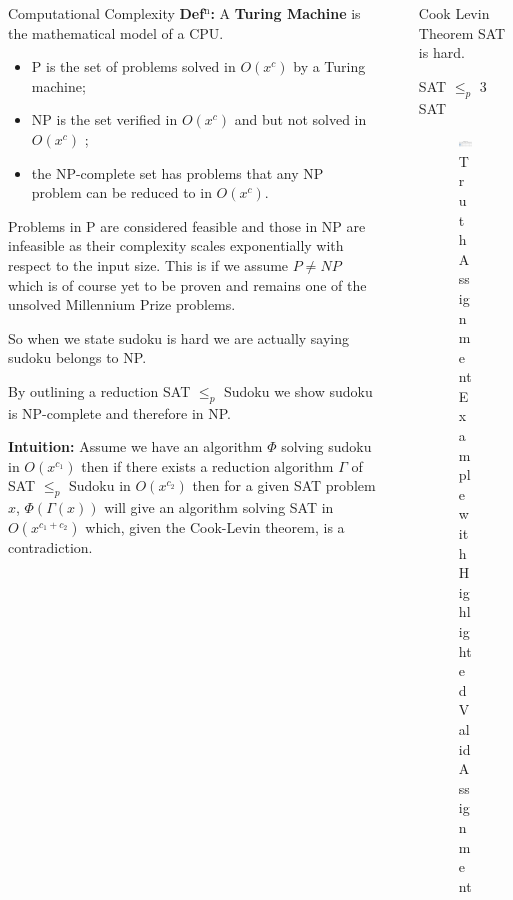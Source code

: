 \documentclass[final]{beamer}
\newlength{\sepwidth}
\newlength{\colwidth}
\newcounter{col}
\newcommand{\separatorcolumn}{\begin{column}{\sepwidth}\end{column}}
\begin{document}
\begin{frame}[t]
\begin{columns}[t]
\begin{column}{\colwidth}
\begin{block}{Computational Complexity \cite{arora2006computational}}
\textbf{Def$^\text{n}$:} A \textbf{Turing Machine} is the mathematical model of a CPU.



 \begin{itemize}
	\item{P is the set of problems solved in $O(x^c)$ by a Turing machine;} 
	\item{NP is the set verified in $O(x^c)$ and but not solved in $O(x^c)$ ;} 
	\item{the NP-complete set has problems that any NP problem can be reduced to in $O(x^c)$.} 
\end{itemize}
Problems in P are considered feasible and those in NP are infeasible as their complexity scales exponentially with respect to the input size. This is if we assume $P\neq NP$ which is of course yet to be proven and remains one of the unsolved Millennium Prize problems. 

So when we state sudoku is hard we are actually saying sudoku belongs to NP.

By outlining a reduction SAT $ \leq_p $ Sudoku we show sudoku is NP-complete and therefore in NP. 

\textbf{Intuition:} Assume we have an algorithm $\Phi$ solving sudoku in $O(x^{c_1})$ then if there exists a reduction algorithm $\Gamma$ of SAT $ \leq_p $ Sudoku in $O(x^{c_2})$  then for a given SAT problem $x$, $\Phi(\Gamma(x))$ will give an algorithm solving SAT in $O(x^{c_1+c_2})$ which, given the Cook-Levin theorem, is a contradiction. 

  \end{block}

\end{column}

\separatorcolumn

\begin{column}{\colwidth}  
\begin{alertblock}{Cook Levin Theorem}
SAT is hard.
  \end{alertblock}
  \begin{block}{SAT $\leq_p$ 3 SAT}

\begin{figure}
		\includegraphics[width=70mm]{sat_example.png}
		\caption{Truth Assignment Example with Highlighted Valid Assignment}
		\vspace{-10pt}
\end{figure}


\end{block}
\end{column}
\end{columns}
\end{frame}
\end{document}
